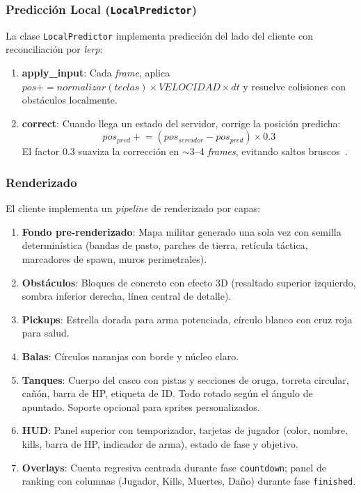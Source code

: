 \documentclass[conference]{IEEEtran}
\begin{document}
\subsubsection{Predicci\'on Local (\texttt{LocalPredictor})}

La clase \texttt{LocalPredictor} implementa predicci\'on del lado del cliente con reconciliaci\'on por \textit{lerp}:

\begin{enumerate}
    \item \textbf{apply\_input}: Cada \textit{frame}, aplica $pos += normalizar(teclas) \times VELOCIDAD \times dt$ y resuelve colisiones con obst\'aculos localmente.
    \item \textbf{correct}: Cuando llega un estado del servidor, corrige la posici\'on predicha:
    \begin{equation}
    pos_{pred} \mathrel{+}= (pos_{servidor} - pos_{pred}) \times 0.3
    \end{equation}
    El factor 0.3 suaviza la correcci\'on en $\sim$3--4 \textit{frames}, evitando saltos bruscos~\cite{gambetta2018}.
\end{enumerate}

\subsubsection{Renderizado}

El cliente implementa un \textit{pipeline} de renderizado por capas:

\begin{enumerate}
    \item \textbf{Fondo pre-renderizado}: Mapa militar generado una sola vez con semilla determin\'istica (bandas de pasto, parches de tierra, ret\'icula t\'actica, marcadores de spawn, muros perimetrales).
    \item \textbf{Obst\'aculos}: Bloques de concreto con efecto 3D (resaltado superior izquierdo, sombra inferior derecha, l\'inea central de detalle).
    \item \textbf{Pickups}: Estrella dorada para arma potenciada, c\'irculo blanco con cruz roja para salud.
    \item \textbf{Balas}: C\'irculos naranjas con borde y n\'ucleo claro.
    \item \textbf{Tanques}: Cuerpo del casco con pistas y secciones de oruga, torreta circular, ca\~n\'on, barra de HP, etiqueta de ID. Todo rotado seg\'un el \'angulo de apuntado. Soporte opcional para sprites personalizados.
    \item \textbf{HUD}: Panel superior con temporizador, tarjetas de jugador (color, nombre, kills, barra de HP, indicador de arma), estado de fase y objetivo.
    \item \textbf{Overlays}: Cuenta regresiva centrada durante fase \texttt{countdown}; panel de ranking con columnas (Jugador, Kills, Muertes, Da\~no) durante fase \texttt{finished}.
\end{enumerate}
\end{document}
